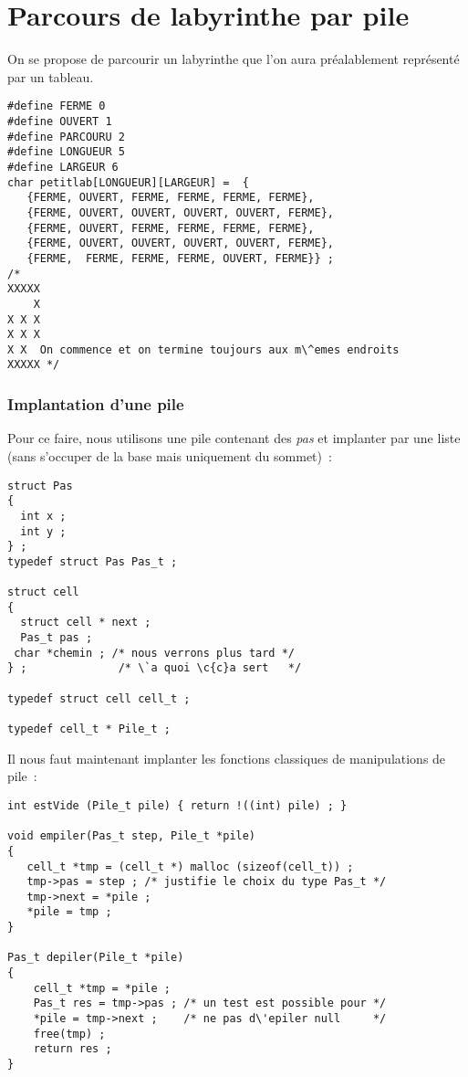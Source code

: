 \section{Parcours de labyrinthe par pile}%
\begin{frame}[fragile]
  On se propose  de parcourir un labyrinthe que l'on
  aura pr\'ealablement repr\'esent\'e par un tableau. 
\begin{verbatim}
#define FERME 0
#define OUVERT 1 
#define PARCOURU 2
#define LONGUEUR 5
#define LARGEUR 6
char petitlab[LONGUEUR][LARGEUR] =  {
   {FERME, OUVERT, FERME, FERME, FERME, FERME},
   {FERME, OUVERT, OUVERT, OUVERT, OUVERT, FERME},
   {FERME, OUVERT, FERME, FERME, FERME, FERME},
   {FERME, OUVERT, OUVERT, OUVERT, OUVERT, FERME},
   {FERME,  FERME, FERME, FERME, OUVERT, FERME}} ;
/*
XXXXX
    X 
X X X
X X X
X X  On commence et on termine toujours aux m\^emes endroits
XXXXX */ 
\end{verbatim}
\end{frame}
\begin{frame}[fragile]
  \frametitle{Implantation d'une pile}%
  Pour ce faire, nous utilisons une pile contenant des \textit{pas} et
  implanter par une liste (sans s'occuper de la base mais uniquement
  du sommet)~:
\begin{verbatim}
struct Pas
{
  int x ;
  int y ;
} ;
typedef struct Pas Pas_t ;

struct cell
{
  struct cell * next ;
  Pas_t pas ;
 char *chemin ; /* nous verrons plus tard */
} ;              /* \`a quoi \c{c}a sert   */

typedef struct cell cell_t ;

typedef cell_t * Pile_t ;
\end{verbatim}
\end{frame}
\begin{frame}[fragile]
  Il nous faut maintenant implanter les fonctions classiques de
  manipulations de pile~:
\begin{verbatim}
int estVide (Pile_t pile) { return !((int) pile) ; }

void empiler(Pas_t step, Pile_t *pile)
{
   cell_t *tmp = (cell_t *) malloc (sizeof(cell_t)) ;
   tmp->pas = step ; /* justifie le choix du type Pas_t */
   tmp->next = *pile ;
   *pile = tmp ;
}

Pas_t depiler(Pile_t *pile)
{
    cell_t *tmp = *pile ;
    Pas_t res = tmp->pas ; /* un test est possible pour */
    *pile = tmp->next ;    /* ne pas d\'epiler null     */
    free(tmp) ;
    return res ;
}
\end{verbatim}
\end{frame}
